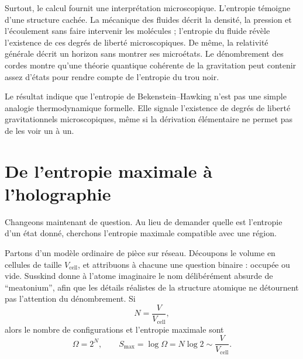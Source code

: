 Surtout, le calcul fournit une interprétation microscopique. L’entropie témoigne d’une structure cachée. La mécanique des fluides décrit la densité, la pression et l’écoulement sans faire intervenir les molécules ; l’entropie du fluide révèle l’existence de ces degrés de liberté microscopiques. De même, la relativité générale décrit un horizon sans montrer ses microétats. Le dénombrement des cordes montre qu’une théorie quantique cohérente de la gravitation peut contenir assez d’états pour rendre compte de l’entropie du trou noir.

\begin{classroomqa}
\end{classroomqa}

Le résultat indique que l’entropie de Bekenstein--Hawking n’est pas une simple analogie thermodynamique formelle. Elle signale l’existence de degrés de liberté gravitationnels microscopiques, même si la dérivation élémentaire ne permet pas de les voir un à un.

\section{De l’entropie maximale à l’holographie}

Changeons maintenant de question. Au lieu de demander quelle est l’entropie d’un état donné, cherchons l’entropie maximale compatible avec une région.

Partons d’un modèle ordinaire de pièce sur réseau. Découpons le volume en cellules de taille \(V_{\mathrm{cell}}\), et attribuons à chacune une question binaire : occupée ou vide. Susskind donne à l’atome imaginaire le nom délibérément absurde de ``meatonium'', afin que les détails réalistes de la structure atomique ne détournent pas l’attention du dénombrement. Si
\begin{equation}
N=\frac{V}{V_{\mathrm{cell}}},
\end{equation}
alors le nombre de configurations et l’entropie maximale sont
\begin{equation}
\Omega=2^N,
\qquad
S_{\max}=\log\Omega=N\log2
\sim\frac{V}{V_{\mathrm{cell}}}.
\label{eq:l07-volume-count}
\end{equation}

